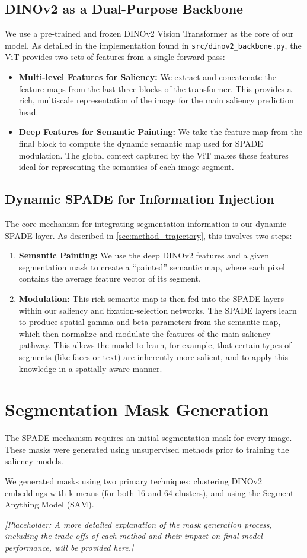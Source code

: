\subsection{DINOv2 as a Dual-Purpose Backbone}
We use a pre-trained and frozen DINOv2 Vision Transformer as the core of our model. As detailed in the implementation found in \verb|src/dinov2_backbone.py|, the ViT provides two sets of features from a single forward pass:
\begin{itemize}
    \item \textbf{Multi-level Features for Saliency:} We extract and concatenate the feature maps from the last three blocks of the transformer. This provides a rich, multi\-scale representation of the image for the main saliency prediction head.
    \item \textbf{Deep Features for Semantic Painting:} We take the feature map from the final block to compute the dynamic semantic map used for SPADE modulation. The global context captured by the ViT makes these features ideal for representing the semantics of each image segment.
\end{itemize}

\subsection{Dynamic SPADE for Information Injection}
The core mechanism for integrating segmentation information is our dynamic SPADE layer. As described in \cref{sec:method_trajectory}, this involves two steps:
\begin{enumerate}
    \item \textbf{Semantic Painting:} We use the deep DINOv2 features and a given segmentation mask to create a \enquote{painted} semantic map, where each pixel contains the average feature vector of its segment.
    \item \textbf{Modulation:} This rich semantic map is then fed into the SPADE layers within our saliency and fixation-selection networks. The SPADE layers learn to produce spatial gamma and beta parameters from the semantic map, which then normalize and modulate the features of the main saliency pathway. This allows the model to learn, for example, that certain types of segments (like faces or text) are inherently more salient, and to apply this knowledge in a spatially-aware manner.
\end{enumerate}

\section{Segmentation Mask Generation}
\label{sec:method_mask_generation}

The SPADE mechanism requires an initial segmentation mask for every image. These masks were generated using unsupervised methods prior to training the saliency models.

We generated masks using two primary techniques: clustering DINOv2 embeddings with k-means (for both 16 and 64 clusters), and using the Segment Anything Model (SAM).

\textit{[Placeholder: A more detailed explanation of the mask generation process, including the trade-offs of each method and their impact on final model performance, will be provided here.]}